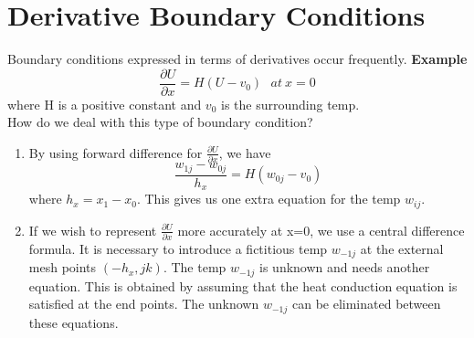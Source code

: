 \section{Derivative Boundary Conditions}
Boundary conditions expressed in terms of derivatives occur frequently.
\textbf{Example}
\[
\frac{\partial U}{\partial x} = H(U-v_0) \ \ \ at \ x=0\]
where H is a positive constant and $v_0$ is the surrounding temp.\\

How do we deal with this type of boundary condition?\\

\begin{enumerate}
\item
By using forward difference for $\frac{\partial U}{\partial x}$, we have
\[
\frac{w_{1j}-w_{0j}}{h_x} = H(w_{0j}-v_0)\]
where $h_x=x_1-x_0$.  This gives us one extra equation for the temp $w_{ij}$.\\
\item
If we wish to represent $\frac{\partial U}{\partial x}$ more accurately at x=0, we use a central difference formula.  It is necessary to introduce a fictitious
temp $w_{-1j}$ at the external mesh points $(-h_x,jk)$.  The temp $w_{-1j}$ is unknown and needs another equation.  This is obtained by assuming that the heat 
conduction equation is satisfied at the end points.  The unknown $w_{-1j}$ can be 
eliminated between these equations.\\
\end{enumerate}
